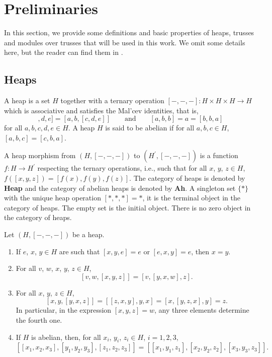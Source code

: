 \documentclass[11pt, twoside]{article}
\begin{document}
\section{Preliminaries}
In this section, we provide some definitions and basic properties of heaps, trusses and modules over trusses that will be used in this work. We omit some details here, but the reader can find them in \cite{mb,tb,rtb,tb2, tbp}.
\subsection{ Heaps}
A heap is a set $H$ together with a ternary operation
$[-,-,-]: H\times H\times H\longrightarrow H$ which is associative and satisfies the Mal'cev identities, that is,
\begin{equation*}
[[a,b,c],d,e] = [a,b,[c,d,e]] \qquad \text{and} \qquad [a,b,b] = a = [b,b,a]
\end{equation*}
for all $a,b,c,d,e\in H$.
A heap $H$ is said to be abelian if for all $a,b,c\in H$, $[a,b,c] = [c,b,a]$.

A heap morphism from $(H,[-,-,-])$ to $(H^\prime,[-,-,-])$ is a function $f:H\longrightarrow H^\prime$ respecting the ternary operations, i.e., such that for all $x$, $y$, $z\in H$, $f([x,y,z])=[f(x),f(y),f(z)]$.
The category of heaps is denoted by \textbf{Heap} and the category of abelian heaps is denoted by \textbf{Ah}. A singleton set $\{\ast\}$  with the unique heap operation $[\ast,\ast,\ast]=\ast$, it is the terminal object in the category of heaps. The empty set is the initial object. There is no zero object in the category of heaps.

\begin{lemma}\label{le.se}{\rm \cite[Lemma 2.3]{rtb}}
Let $(H,[-,-,-])$ be a heap.
\begin{enumerate}
\item[{\rm (1)}] If $e$, $x$, $y\in H$ are such that $[x,y,e]=e$ or $[e,x,y]=e$, then $x=y$.
\item[{\rm (2)}] For all $v$, $w$, $x$, $y$, $z\in H$,
$$[v,w,[x,y,z]]=[v,[y,x,w],z].$$
\item[{\rm (3)}] For all $x$, $y$, $z\in H$,
$$[x,y,[y,x,z]]=[[z,x,y],y,x]=[x,[y,z,x],y]=z.$$
In particular, in the expression $[x,y,z]=w$, any three elements determine the fourth one.
\item[{\rm (4)}] If $H$ is abelian, then, for all $x_i$, $y_i$, $z_i\in H$, $i=1,2,3$,
$$[[x_1,x_2,x_3],[y_1,y_2,y_3],[z_1,z_2,z_3]]=[[x_1,y_1,z_1],[x_2,y_2,z_2],[x_3,y_3,z_3]].$$
\end{enumerate}
\end{lemma}
\end{document}
